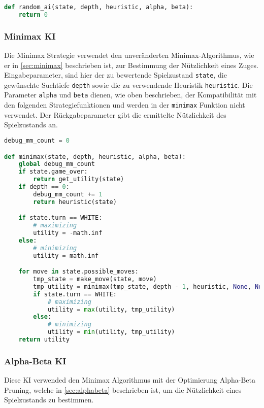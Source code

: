 \begin{lstlisting}[language=Python]
def random_ai(state, depth, heuristic, alpha, beta):
    return 0
\end{lstlisting}

\hypertarget{minimax-ki}{%
\subsubsection{Minimax KI}\label{minimax-ki}}

Die Minimax Strategie verwendet den unveränderten Minimax-Algorithmus,
wie er in \autoref{sec:minimax} beschrieben ist, zur Bestimmung der
Nützlichkeit eines Zuges. Eingabeparameter, sind hier der zu bewertende
Spielzustand \passthrough{\lstinline!state!}, die gewünschte Suchtiefe
\passthrough{\lstinline!depth!} sowie die zu verwendende Heuristik
\passthrough{\lstinline!heuristic!}. Die Parameter
\passthrough{\lstinline!alpha!} und \passthrough{\lstinline!beta!}
dienen, wie oben beschrieben, der Kompatibilität mit den folgenden
Strategiefunktionen und werden in der \passthrough{\lstinline!minimax!}
Funktion nicht verwendet. Der Rückgabeparameter gibt die ermittelte
Nützlichkeit des Spielzustands an.

\begin{lstlisting}[language=Python]
debug_mm_count = 0

def minimax(state, depth, heuristic, alpha, beta):
    global debug_mm_count
    if state.game_over:
        return get_utility(state)
    if depth == 0:
        debug_mm_count += 1
        return heuristic(state)

    if state.turn == WHITE:
        # maximizing
        utility = -math.inf
    else:
        # minimizing
        utility = math.inf

    for move in state.possible_moves:
        tmp_state = make_move(state, move)
        tmp_utility = minimax(tmp_state, depth - 1, heuristic, None, None)
        if state.turn == WHITE:
            # maximizing
            utility = max(utility, tmp_utility)
        else:
            # minimizing
            utility = min(utility, tmp_utility)
    return utility
\end{lstlisting}

\hypertarget{alpha-beta-ki}{%
\subsubsection{Alpha-Beta KI}\label{alpha-beta-ki}}

Diese KI verwended den Minimax Algorithmus mit der Optimierung
Alpha-Beta Pruning, welche in \autoref{sec:alphabeta} beschrieben ist,
um die Nützlichkeit eines Spielzustands zu bestimmen.

